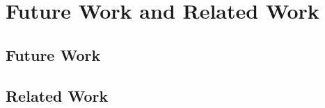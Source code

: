 \chapter{Future Work and Related Work}
\label{chap:future}
\section{Future Work}
\section{Related Work}
